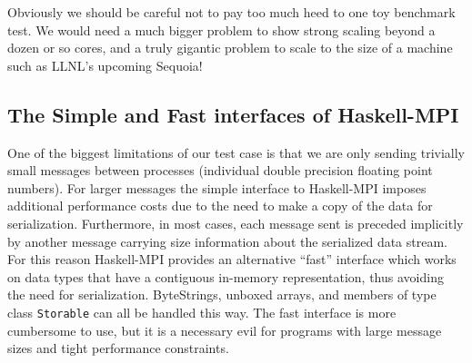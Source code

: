 \documentclass{tmr}
\begin{document}
Obviously we should be careful not to pay too much heed to one toy benchmark test.
We would need a much bigger problem to show strong scaling beyond a dozen or so cores,
and a truly gigantic problem to scale to the size of a machine such as LLNL's
upcoming Sequoia!

\subsection{The Simple and Fast interfaces of Haskell-MPI}

One of the biggest limitations of our test case is that we are only sending trivially
small messages between processes (individual double precision floating point numbers).
For larger messages the simple interface to Haskell-MPI imposes additional
performance costs due to the need to make a copy of the data for serialization.
Furthermore, in most cases, each message sent is preceded implicitly by another
message carrying size information about the serialized data stream.
For this reason Haskell-MPI provides an alternative ``fast'' interface which works
on data types that have a contiguous in-memory representation, thus avoiding
the need for serialization. ByteStrings, unboxed arrays, and members of type class
\verb|Storable| can all be handled this way. The fast interface is more
cumbersome to use, but it is a necessary evil for programs with large message sizes
and tight performance constraints.

\end{document}
